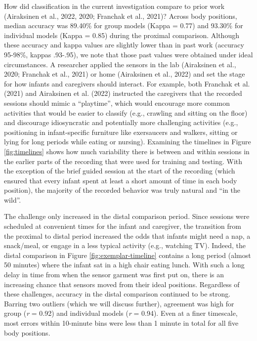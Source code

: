 \documentclass[
  man]{apa6}
\begin{document}
How did classification in the current investigation compare to prior work (Airaksinen et al., 2022, 2020; Franchak et al., 2021)? Across body positions, median accuracy was 89.40\% for group models (Kappa = 0.77) and 93.30\% for individual models (Kappa = 0.85) during the proximal comparison. Although these accuracy and kappa values are slightly lower than in past work (accuracy 95-98\%, kappas .93-.95), we note that those past values were obtained under ideal circumstances. A researcher applied the sensors in the lab (Airaksinen et al., 2020; Franchak et al., 2021) or home (Airaksinen et al., 2022) and set the stage for how infants and caregivers should interact. For example, both Franchak et al. (2021) and Airaksinen et al. (2022) instructed the caregivers that the recorded sessions should mimic a ``playtime'', which would encourage more common activities that would be easier to classify (e.g., crawling and sitting on the floor) and discourage idiosyncratic and potentially more challenging activities (e.g., positioning in infant-specific furniture like exersaucers and walkers, sitting or lying for long periods while eating or nursing). Examining the timelines in Figure \ref{fig:timelines} shows how much variability there is between and within sessions in the earlier parts of the recording that were used for training and testing. With the exception of the brief guided session at the start of the recording (which ensured that every infant spent at least a short amount of time in each body position), the majority of the recorded behavior was truly natural and ``in the wild''.

The challenge only increased in the distal comparison period. Since sessions were scheduled at convenient times for the infant and caregiver, the transition from the proximal to distal period increased the odds that infants might need a nap, a snack/meal, or engage in a less typical activity (e.g., watching TV). Indeed, the distal comparison in Figure \ref{fig:exemplar-timeline} contains a long period (almost 50 minutes) where the infant sat in a high chair eating lunch. With such a long delay in time from when the sensor garment was first put on, there is an increasing chance that sensors moved from their ideal positions. Regardless of these challenges, accuracy in the distal comparison continued to be strong. Barring two outliers (which we will discuss further), agreement was high for group (\emph{r} = 0.92) and individual models (\emph{r} = 0.94). Even at a finer timescale, most errors within 10-minute bins were less than 1 minute in total for all five body positions.
\end{document}
